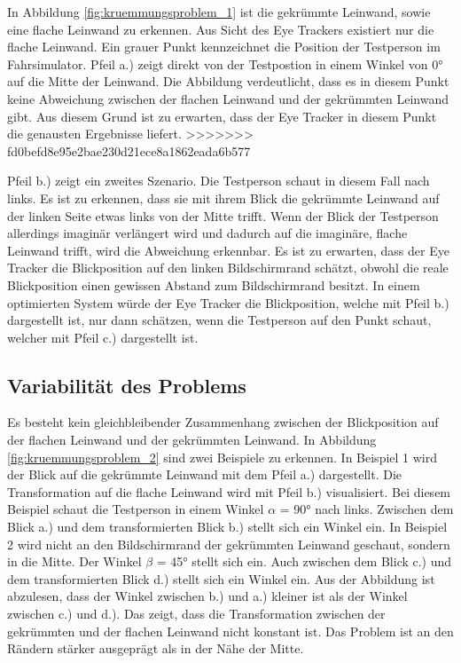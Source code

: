 In Abbildung \ref{fig:kruemmungsproblem_1} ist die gekrümmte Leinwand, sowie eine flache Leinwand zu erkennen. Aus Sicht des Eye Trackers existiert nur die flache Leinwand. Ein grauer Punkt kennzeichnet die Position der Testperson im Fahrsimulator. Pfeil a.) zeigt direkt von der Testpostion in einem Winkel von 0° auf die Mitte der Leinwand. Die Abbildung verdeutlicht, dass es in diesem Punkt keine Abweichung zwischen der flachen Leinwand und der gekrümmten Leinwand gibt. Aus diesem Grund ist zu erwarten, dass der Eye Tracker in diesem Punkt die genausten Ergebnisse liefert. 
>>>>>>> fd0befd8e95e2bae230d21ece8a1862eada6b577

Pfeil b.) zeigt ein zweites Szenario. Die Testperson schaut in diesem Fall nach links. Es ist zu erkennen, dass sie mit ihrem Blick die gekrümmte Leinwand auf der linken Seite etwas links von der Mitte trifft. Wenn der Blick der Testperson allerdings imaginär verlängert wird und dadurch auf die imaginäre, flache Leinwand trifft, wird die Abweichung erkennbar. Es ist zu erwarten, dass der Eye Tracker die Blickposition auf den linken Bildschirmrand schätzt, obwohl die reale Blickposition einen gewissen Abstand zum Bildschirmrand besitzt. In einem optimierten System würde der Eye Tracker die Blickposition, welche mit Pfeil b.) dargestellt ist, nur dann schätzen, wenn die Testperson auf den Punkt schaut, welcher mit Pfeil c.) dargestellt ist.


\subsection{Variabilität des Problems}

Es besteht kein gleichbleibender Zusammenhang zwischen der Blickposition auf der flachen Leinwand und der gekrümmten Leinwand. In Abbildung \ref{fig:kruemmungsproblem_2} sind zwei Beispiele zu erkennen. In Beispiel 1 wird der Blick auf die gekrümmte Leinwand mit dem Pfeil a.) dargestellt. Die Transformation auf die flache Leinwand wird mit Pfeil b.) visualisiert. Bei diesem Beispiel schaut die Testperson in einem Winkel $\alpha$ = 90° nach links. Zwischen dem Blick a.) und dem transformierten Blick b.) stellt sich ein Winkel ein. In Beispiel 2 wird nicht an den Bildschirmrand der gekrümmten Leinwand geschaut, sondern in die Mitte. Der Winkel $\beta$ = 45° stellt sich ein. Auch zwischen dem Blick c.) und dem transformierten Blick d.) stellt sich ein Winkel ein. Aus der Abbildung ist abzulesen, dass der Winkel zwischen b.) und a.) kleiner ist als der Winkel zwischen c.) und d.). Das zeigt, dass die Transformation zwischen der gekrümmten und der flachen Leinwand nicht konstant ist. Das Problem ist an den Rändern stärker ausgeprägt als in der Nähe der Mitte.


